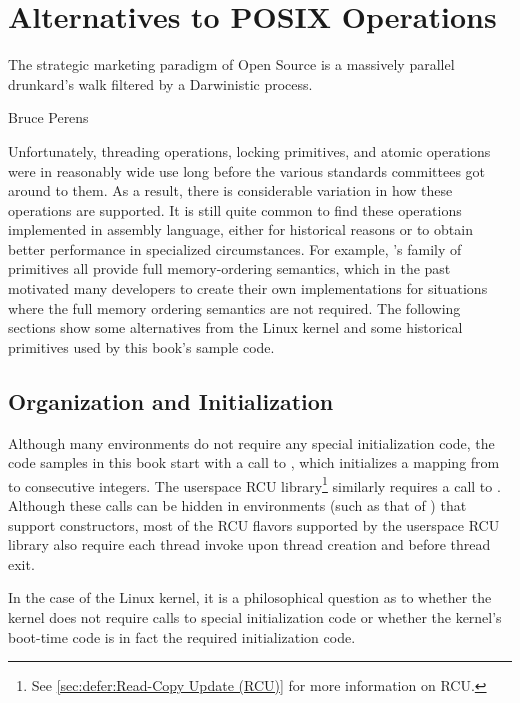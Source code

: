 \section{Alternatives to POSIX Operations}
\label{sec:toolsoftrade:Alternatives to POSIX Operations}
%
\epigraph{The strategic marketing paradigm of Open Source is a massively
	  parallel drunkard's walk filtered by a Darwinistic process.}
	 {Bruce Perens}

Unfortunately, threading operations, locking primitives, and atomic
operations were in reasonably wide use long before the various standards
committees got around to them.
As a result, there is considerable variation in how these operations
are supported.
It is still quite common to find these operations implemented in
assembly language, either for historical reasons or to obtain better
performance in specialized circumstances.
For example, \GCC's  family of primitives all provide full
memory-ordering semantics, which in the past motivated many developers
to create their own implementations for situations where the full memory
ordering semantics are not required.
The following sections show some alternatives from the Linux kernel
and some historical primitives used by this book's sample code.

\subsection{Organization and Initialization}
\label{sec:toolsoftrade:Organization and Initialization}

Although many environments do not require any special initialization
code, the code samples in this book start with a call to ,
which initializes a mapping from  to consecutive integers.
The userspace RCU library\footnote{
	See \cref{sec:defer:Read-Copy Update (RCU)} for more information
	on RCU\@.}
similarly requires a call to .
Although these calls can be hidden in environments (such as that of
\GCC) that support constructors,
most of the RCU flavors supported by the userspace RCU library
also require each thread invoke  upon thread
creation and  before thread exit.

In the case of the Linux kernel, it is a philosophical question as to
whether the kernel does not require calls to special initialization
code or whether the kernel's boot-time code is in fact the required
initialization code.

